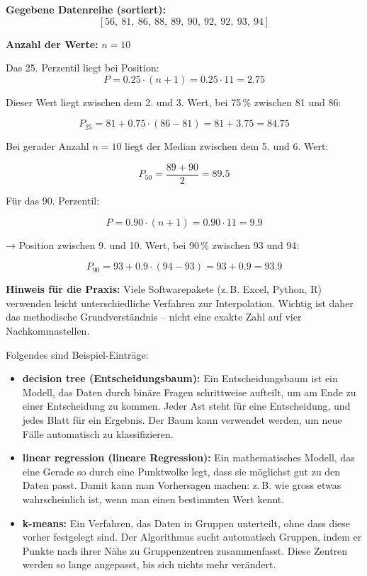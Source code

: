 \begin{aufgabe}{4}

\textbf{Gegebene Datenreihe (sortiert):}
\[
[56,\ 81,\ 86,\ 88,\ 89,\ 90,\ 92,\ 92,\ 93,\ 94]
\]

\textbf{Anzahl der Werte:} $n = 10$

Das 25. Perzentil liegt bei Position:
\[
P = 0.25 \cdot (n + 1) = 0.25 \cdot 11 = 2.75
\]

Dieser Wert liegt zwischen dem 2. und 3. Wert, bei 75 \% zwischen 81 und 86:

\[
P_{25} = 81 + 0.75 \cdot (86 - 81) = 81 + 3.75 = \boxed{84.75}
\]

Bei gerader Anzahl $n = 10$ liegt der Median zwischen dem 5. und 6. Wert:

\[
P_{50} = \frac{89 + 90}{2} = \boxed{89.5}
\]

Für das 90. Perzentil:

\[
P = 0.90 \cdot (n + 1) = 0.90 \cdot 11 = 9.9
\]

→ Position zwischen 9. und 10. Wert, bei 90 \% zwischen 93 und 94:

\[
P_{90} = 93 + 0.9 \cdot (94 - 93) = 93 + 0.9 = \boxed{93.9}
\]

\textbf{Hinweis für die Praxis:} Viele Softwarepakete (z. B. Excel, Python, R) verwenden leicht unterschiedliche Verfahren zur Interpolation. Wichtig ist daher das methodische Grundverständnis – nicht eine exakte Zahl auf vier Nachkommastellen.

\end{aufgabe}

\begin{aufgabe}{6} Folgendes sind Beispiel-Einträge:

\begin{itemize}
  \item \textbf{decision tree (Entscheidungsbaum):}  
  Ein Entscheidungsbaum ist ein Modell, das Daten durch binäre Fragen schrittweise aufteilt, um am Ende zu einer Entscheidung zu kommen. Jeder Ast steht für eine Entscheidung, und jedes Blatt für ein Ergebnis. Der Baum kann verwendet werden, um neue Fälle automatisch zu klassifizieren.

  \item \textbf{linear regression (lineare Regression):}  
  Ein mathematisches Modell, das eine Gerade so durch eine Punktwolke legt, dass sie möglichst gut zu den Daten passt. Damit kann man Vorhersagen machen: z. B. wie gross etwas wahrscheinlich ist, wenn man einen bestimmten Wert kennt.

  \item \textbf{k-means:}  
  Ein Verfahren, das Daten in Gruppen unterteilt, ohne dass diese vorher festgelegt sind. Der Algorithmus sucht automatisch Gruppen, indem er Punkte nach ihrer Nähe zu Gruppenzentren zusammenfasst. Diese Zentren werden so lange angepasst, bis sich nichts mehr verändert.
\end{itemize}

\end{aufgabe}

